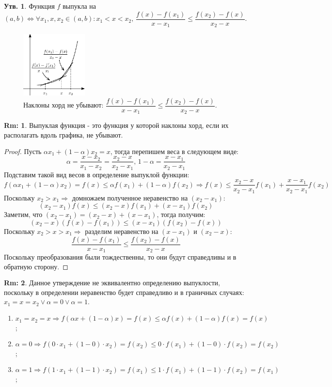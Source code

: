 \documentclass[12pt]{article}
\theoremstyle{definition}
\newtheorem{rem}{Rm:}
\newtheorem{prop}{Утв.}
\begin{document}
\begin{prop}
	Функция $f$ выпукла на $(a,b) \Leftrightarrow \forall x_1,x,x_2 \in (a,b) \colon x_1 < x < x_2, \, \dfrac{f(x) - f(x_1)}{x - x_1} \leq \dfrac{f(x_2) - f(x)}{x_2 - x}$.
\end{prop}
\begin{figure}[H]
	\centering
	\includegraphics[width=0.3\textwidth]{27_6.eps}
	\caption{Наклоны хорд не убывают: $\dfrac{f(x) - f(x_1)}{x - x_1} \leq \dfrac{f(x_2) - f(x)}{x_2 - x}$.}
	\label{27_6}
\end{figure}
\begin{rem}
	Выпуклая функция - это функция у которой наклоны хорд, если их располагать вдоль графика, не убывают.
\end{rem}
\begin{proof} 
	Пусть $\alpha x_1  + (1-\alpha) x_2 = x$, тогда перепишем веса в следующем 	виде:
	$$ \alpha = \dfrac{x - x_2}{x_1 - x_2} = \dfrac{x_2 - x}{x_2 - x_1}, \, 1 - \alpha = \dfrac{x - x_1}{x_2 - x_1}$$
	Подставим такой вид весов в определение выпуклой функции:
	$$f(\alpha x_1 + (1-\alpha) x_2) = f(x) \leq \alpha f(x_1) + (1-\alpha)f(x_2) \Rightarrow  f(x) \leq \dfrac{x_2 - x}{x_2 - x_1} f(x_1) + \dfrac{x - x_1}{x_2 - x_1} f(x_2)$$
	Поскольку $x_2 > x_1 \Rightarrow$ домножаем полученное неравенство на $(x_2 - x_1)$: $$(x_2 - x_1) f(x) \leq (x_2 - x)f(x_1) + (x - x_1)f(x_2)$$
	Заметим, что $(x_2 - x_1) = (x_2 - x) + (x - x_1)$, тогда получим:
	$$(x_2 - x)(f(x) - f(x_1)) \leq (x - x_1) (f(x_2) - f(x))$$
	Поскольку $x_2 > x > x_1 \Rightarrow$ разделим неравенство на $(x-x_1)$ и $(x_2 - x)$:
	$$\dfrac{f(x) - f(x_1)}{x - x_1} \leq \dfrac{f(x_2) - f(x)}{x_2 - x}$$
	Поскольку преобразования были тождественны, то они будут справедливы и в обратную сторону.
\end{proof}
\begin{rem}
	Данное утверждение не эквивалентно определению выпуклости, поскольку в определении неравенство будет справедливо и в граничных случаях: $x_1 = x = x_2 \vee \alpha = 0 \vee \alpha = 1$.
	\begin{enumerate}[label={(\arabic*)}]
		\item $x_1 = x_2 = x \Rightarrow f(\alpha x + (1-\alpha)x) = f(x) \leq \alpha f(x) + (1 - \alpha) f(x) = f(x)$;
		\item $\alpha = 0 \Rightarrow f(0{\cdot}x_1 + (1-0){\cdot}x_2) =f(x_2) \leq 0{\cdot}f(x_1) + (1-0){\cdot}f(x_2) = f(x_2)$;
		\item $\alpha = 1 \Rightarrow f(1{\cdot}x_1 + (1-1){\cdot}x_2) =f(x_1) \leq 1{\cdot}f(x_1) + (1-1){\cdot}f(x_2) = f(x_1)$;
	\end{enumerate}
\end{rem}
\end{document}
